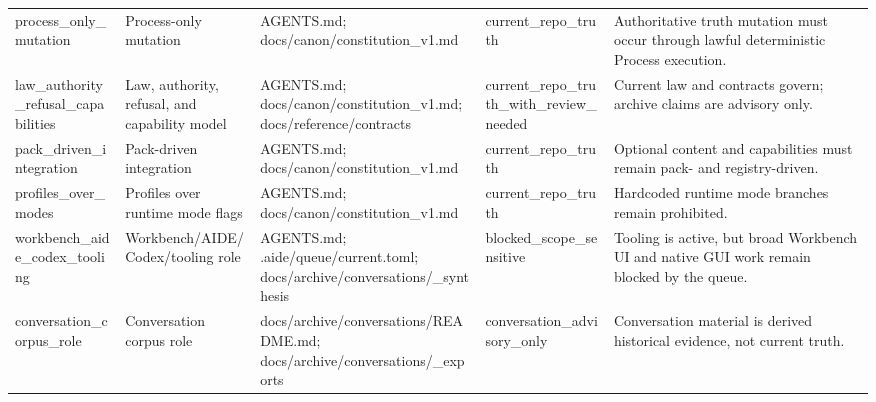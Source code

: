\documentclass[10.5pt,a4paper,openany]{book}
\begin{document}
\begin{center}
{\begin{tabularx}{\linewidth}{@{}>{\raggedright\arraybackslash}X >{\raggedright\arraybackslash}X >{\raggedright\arraybackslash}X >{\raggedright\arraybackslash}X >{\raggedright\arraybackslash}X@{}}
process\_\allowbreak{}only\_\allowbreak{}mutation & Process-\allowbreak{}only mutation & AGENTS.\allowbreak{}md; docs/\allowbreak{}canon/\allowbreak{}constitution\_\allowbreak{}v1.\allowbreak{}md & current\_\allowbreak{}repo\_\allowbreak{}truth & Authoritative truth mutation must occur through lawful deterministic Process execution.\allowbreak{} \\
law\_\allowbreak{}authority\_\allowbreak{}refusal\_\allowbreak{}capabilities & Law, authority, refusal, and capability model & AGENTS.\allowbreak{}md; docs/\allowbreak{}canon/\allowbreak{}constitution\_\allowbreak{}v1.\allowbreak{}md; docs/\allowbreak{}reference/\allowbreak{}contracts & current\_\allowbreak{}repo\_\allowbreak{}truth\_\allowbreak{}with\_\allowbreak{}review\_\allowbreak{}needed & Current law and contracts govern; archive claims are advisory only.\allowbreak{} \\
pack\_\allowbreak{}driven\_\allowbreak{}integration & Pack-\allowbreak{}driven integration & AGENTS.\allowbreak{}md; docs/\allowbreak{}canon/\allowbreak{}constitution\_\allowbreak{}v1.\allowbreak{}md & current\_\allowbreak{}repo\_\allowbreak{}truth & Optional content and capabilities must remain pack-\allowbreak{} and registry-\allowbreak{}driven.\allowbreak{} \\
profiles\_\allowbreak{}over\_\allowbreak{}modes & Profiles over runtime mode flags & AGENTS.\allowbreak{}md; docs/\allowbreak{}canon/\allowbreak{}constitution\_\allowbreak{}v1.\allowbreak{}md & current\_\allowbreak{}repo\_\allowbreak{}truth & Hardcoded runtime mode branches remain prohibited.\allowbreak{} \\
workbench\_\allowbreak{}aide\_\allowbreak{}codex\_\allowbreak{}tooling & Workbench/\allowbreak{}AIDE/\allowbreak{}Codex/\allowbreak{}tooling role & AGENTS.\allowbreak{}md; .\allowbreak{}aide/\allowbreak{}queue/\allowbreak{}current.\allowbreak{}toml; docs/\allowbreak{}archive/\allowbreak{}conversations/\allowbreak{}\_\allowbreak{}synthesis & blocked\_\allowbreak{}scope\_\allowbreak{}sensitive & Tooling is active, but broad Workbench UI and native GUI work remain blocked by the queue.\allowbreak{} \\
conversation\_\allowbreak{}corpus\_\allowbreak{}role & Conversation corpus role & docs/\allowbreak{}archive/\allowbreak{}conversations/\allowbreak{}README.\allowbreak{}md; docs/\allowbreak{}archive/\allowbreak{}conversations/\allowbreak{}\_\allowbreak{}exports & conversation\_\allowbreak{}advisory\_\allowbreak{}only & Conversation material is derived historical evidence, not current truth.\allowbreak{} \\

\end{tabularx}}
\end{center}
\end{document}
